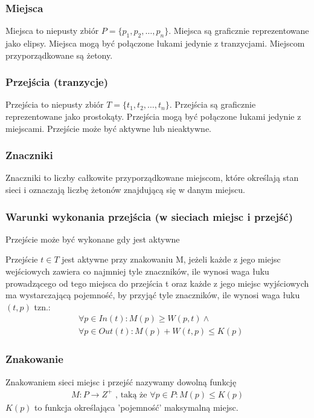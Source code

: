 \documentclass[a4paper,15pt]{article}
\newcommand{\definition}[2]{
    \begin{tcolorbox}[colback=green!5!white,colframe=mGreen,title={Definicja -  #1}]
        #2
    \end{tcolorbox}
}
\begin{document}
\subsubsection{Miejsca}
Miejsca to niepusty zbiór $P = \{ p_1, p_2, \dots , p_n \}$. Miejsca są graficznie reprezentowane jako elipsy. Miejsca mogą być połączone łukami jedynie z tranzycjami. Miejscom przyporządkowane są żetony.


\subsubsection{Przejścia (tranzycje)}
Przejścia to niepusty zbiór $T = \{ t_1, t_2, \dots , t_n \}$. Przejścia są graficznie reprezentowane jako prostokąty. Przejścia mogą być połączone łukami jedynie z miejscami. Przejście może być aktywne lub nieaktywne.

\subsubsection{Znaczniki}
Znaczniki to liczby całkowite przyporządkowane miejscom, które określają stan sieci i oznaczają liczbę żetonów znajdującą się w danym miejscu.

\newpage
\subsubsection{Warunki wykonania przejścia (w sieciach miejsc i przejść)}
Przejście może być wykonane gdy jest aktywne
\definition{Przejście aktywne - Sieć miejsc i przejść}{
Przejście $t \in T$ jest aktywne przy znakowaniu M, jeżeli każde z jego miejsc wejściowych zawiera co najmniej tyle znaczników, ile wynosi waga łuku prowadzącego od tego miejsca do przejścia t oraz każde z jego miejsc wyjściowych ma wystarczającą pojemność, by przyjąć tyle znaczników, ile wynosi waga łuku $(t,p)$ tzn.: 
\begin{align*}
& \forall p \in In(t): M(p) \geq W(p,t) \wedge \\
& \forall p \in Out(t): M(p) + W(t,p) \leq K(p)
\end{align*}
}

\subsubsection{Znakowanie}
\definition{Znakowanie}{
Znakowaniem sieci miejsc i przejść nazywamy dowolną funkcję 
\begin{align*}
M: P \rightarrow Z^+ \text{ , taką że } \forall p \in P: M(p) \leq K(p)
\end{align*}
$K(p)$ to funkcja określająca 'pojemność' maksymalną miejsc.
}
\end{document}
